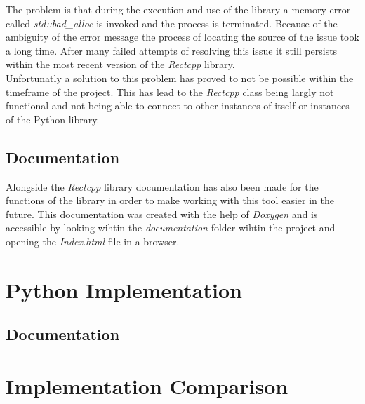 The problem is that during the execution and use of the library a memory error called \textit{std::bad\_alloc} is invoked and the process is terminated. Because of 
the ambiguity of the error message the process of locating the source of the issue took a long time. After many failed attempts of resolving this issue it still
persists within the most recent version of the \textit{Rectcpp} library.\\

Unfortunatly a solution to this problem has proved to not be possible within the timeframe of the project. This has lead to the \textit{Rectcpp} class being 
largly not functional and not being able to connect to other instances of itself or instances of the Python library.

\subsection{Documentation}
Alongside the \textit{Rectcpp} library documentation has also been made for the functions of the library in order to make working with this tool easier in the future.
This documentation was created with the help of \textit{Doxygen} and is accessible by looking wihtin the \textit{documentation} folder wihtin the project and opening
the \textit{Index.html} file in a browser. 


\section{Python Implementation}

\subsection{Documentation}

\section{Implementation Comparison}

\filbreak
